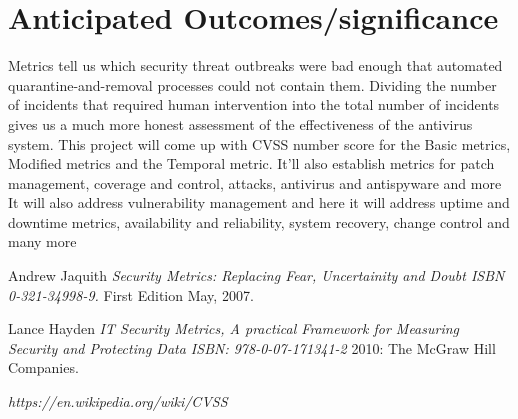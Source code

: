 \documentclass{article}
\begin{document}
\section{Anticipated Outcomes/significance} Metrics tell us
which security threat outbreaks were bad enough that automated quarantine-and-removal
processes could not contain them. Dividing the number of incidents that required
human intervention into the total number of incidents gives us a much more honest
assessment of the effectiveness of the antivirus system. \linebreak
This project will come up with CVSS number score for the Basic metrics, Modified metrics and the Temporal metric. It’ll also establish metrics for patch management, coverage and control, attacks, antivirus and antispyware and more
It will also address vulnerability management and here it will address uptime and downtime metrics, availability and reliability, system recovery, change control and many more

 \begin{thebibliography}{1}

   Andrew Jaquith {\em Security Metrics: Replacing Fear, Uncertainity and Doubt
 ISBN 0-321-34998-9.} First Edition May, 2007.

    Lance Hayden {\em IT Security Metrics, A practical Framework for Measuring Security and Protecting Data ISBN: 978-0-07-171341-2} 2010:
  The McGraw Hill Companies.

    {\em https://en.wikipedia.org/wiki/CVSS

} 

  \end{thebibliography}
\end{document}
